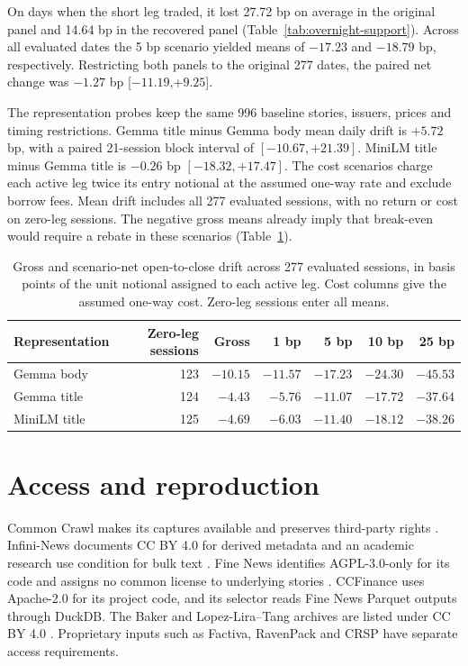 On days when the short leg traded, it lost 27.72 bp on average in the
original panel and 14.64 bp in the recovered panel
(Table~\ref{tab:overnight-support}). Across all evaluated dates the
5 bp scenario yielded means of $-17.23$ and $-18.79$ bp, respectively.
Restricting both panels to the original 277 dates, the paired net change
was $-1.27$ bp [$-11.19$,$+9.25$].

The representation probes keep the same 996 baseline stories, issuers,
prices and timing restrictions. Gemma title minus Gemma body mean daily
drift is $+5.72$ bp, with a paired 21-session block interval of
$[-10.67,+21.39]$. MiniLM title minus Gemma title is $-0.26$ bp
$[-18.32,+17.47]$. The cost scenarios charge each active leg twice its
entry notional at the assumed one-way rate and exclude borrow fees.
Mean drift includes all 277 evaluated sessions, with no return or cost
on zero-leg sessions. The negative gross means already imply that
break-even would require a rebate in these scenarios
(Table~\ref{tab:app-drift}).

\begin{table}[t]
  \centering
  \small
  \caption{Gross and scenario-net open-to-close drift across 277 evaluated
    sessions, in basis points of the unit notional assigned to each
    active leg. Cost columns
  give the assumed one-way cost. Zero-leg sessions enter all means.}
  \label{tab:app-drift}
  \begin{tabular}{lrrrrrr}
    \toprule
    Representation & Zero-leg sessions & Gross & 1 bp & 5 bp & 10 bp & 25 bp \\
    \midrule
    Gemma body & 123 & $-10.15$ & $-11.57$ & $-17.23$ & $-24.30$ & $-45.53$ \\
    Gemma title & 124 & $-4.43$ & $-5.76$ & $-11.07$ & $-17.72$ & $-37.64$ \\
    MiniLM title & 125 & $-4.69$ & $-6.03$ & $-11.40$ & $-18.12$ & $-38.26$ \\
    \bottomrule
  \end{tabular}
\end{table}

\clearpage
\section{Access and reproduction}

Common Crawl makes its captures available and preserves third-party
rights \citep{commoncrawlterms}. Infini-News documents CC BY 4.0 for
derived metadata and an academic research use condition for bulk text
\citep{lazzaroni2026}. Fine News identifies AGPL-3.0-only for its code
and assigns no common license to underlying stories \citep{solovev2026}.
CCFinance uses Apache-2.0 for its project code, and its selector
reads Fine News Parquet outputs through DuckDB. The Baker
and Lopez-Lira--Tang archives are listed under CC BY 4.0
\citep{baker2025archive,lopez2026archive}. Proprietary inputs such as
Factiva, RavenPack and CRSP have separate access requirements.

